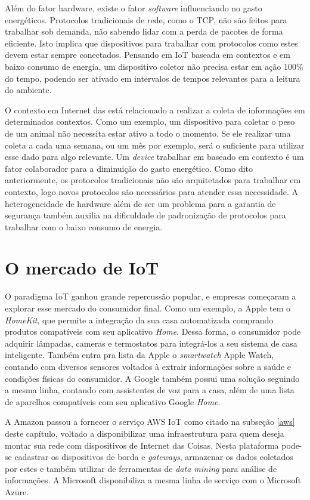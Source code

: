 \documentclass[
    hidelinks,
	12pt,				%
	openany,
	oneside, 
	a4paper,			%
	english,			%
	french,				%
	spanish,			%
	brazil				%
	]{abntex2}
\begin{document}
Além do fator hardware, existe o fator \textit{software} influenciando no gasto energéticos. Protocolos tradicionais de rede, como o TCP, não são feitos para trabalhar sob demanda, não sabendo lidar com a perda de pacotes de forma eficiente. Isto implica que dispositivos para trabalhar com protocolos como estes devem estar sempre conectados. Pensando em IoT baseada em contextos e em baixo consumo de energia, um dispositivo coletor não precisa estar em ação 100\% do tempo, podendo ser ativado em intervalos de tempos relevantes para a leitura do ambiente.

O contexto em Internet das está relacionado a realizar a coleta de informações em determinados contextos. Como um exemplo, um dispositivo para coletar o peso de um animal não necessita estar ativo a todo o momento. Se ele realizar uma coleta a cada uma semana, ou um mês por exemplo, será o suficiente para utilizar esse dado para algo relevante. Um \textit{device} trabalhar em baseado em contexto é um fator colaborador para a diminuição do gasto energético. Como dito anteriormente, os protocolos tradicionais não são arquitetados para trabalhar em contexto, logo novos protocolos são necessários para atender essa necessidade. A heterogeneidade de hardware além de ser um problema para a garantia de segurança também auxilia na dificuldade de padronização de protocolos para trabalhar com o baixo consumo de energia.


\section{O mercado de IoT}

O paradigma IoT ganhou grande repercussão popular, e empresas começaram a explorar esse mercado do consumidor final. Como um exemplo, a Apple tem o \textit{HomeKit}, que permite a integração da sua casa automatizada comprando produtos compatíveis com seu aplicativo  \textit{Home}. Dessa forma, o consumidor pode adquirir lâmpadas, cameras e termostatos para integrá-los a seu sistema de casa inteligente. Também entra pra lista da Apple o \textit{smartwatch} Apple Watch, contando com diversos sensores voltados à extrair informações sobre a saúde e condições físicas do consumidor. A Google também possui uma solução seguindo a mesma linha, contando com assistentes de voz para a casa, além de uma lista de aparelhos compatíveis com seu aplicativo Google \textit{Home}.

A Amazon passou a fornecer o serviço AWS IoT como citado na subseção \ref{aws} deste capítulo, voltado a disponibilizar uma infraestrutura para quem deseja montar sua rede com dispositivos de Internet das Coisas. Nesta plataforma pode-se cadastrar os dispositivos de borda e \textit{gateways}, armazenar os dados coletados por estes e também utilizar de ferramentas de \textit{data mining} para análise de informações. A Microsoft disponibiliza a mesma linha de serviço com o Microsoft Azure.
\end{document}
